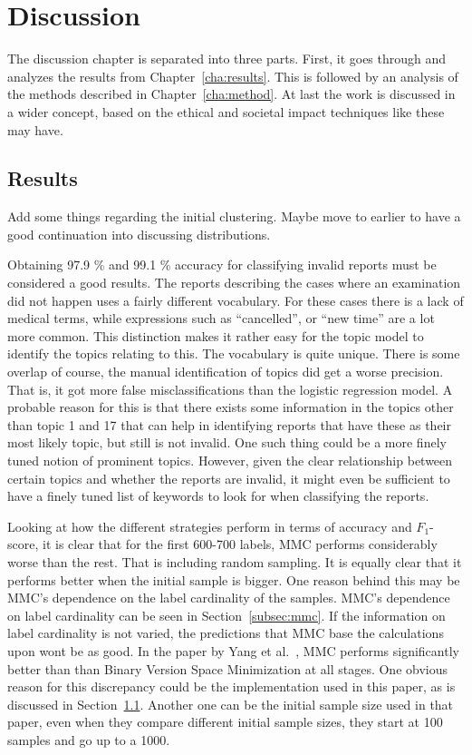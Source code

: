 \chapter{Discussion}
\label{cha:discussion}

The discussion chapter is separated into three parts.
First, it goes through and analyzes the results from Chapter~\ref{cha:results}.
This is followed by an analysis of the methods described in Chapter~\ref{cha:method}.
At last the work is discussed in a wider concept, based on the ethical and societal impact techniques like these may have.

\section{Results}
\label{sec:discussion-results}

Add some things regarding the initial clustering. Maybe move to earlier to have a good continuation into discussing distributions.

Obtaining 97.9 \% and 99.1 \% accuracy for classifying invalid reports must be considered a good results.
The reports describing the cases where an examination did not happen uses a fairly different vocabulary.
For these cases there is a lack of medical terms, while expressions such as ``cancelled'', or ``new time'' are a lot more common.
This distinction makes it rather easy for the topic model to identify the topics relating to this.
The vocabulary is quite unique.
There is some overlap of course, the manual identification of topics did get a worse precision.
That is, it got more false misclassifications than the logistic regression model.
A probable reason for this is that there exists some information in the topics other than topic 1 and 17 that can help in identifying reports that have these as their most likely topic, but still is not invalid.
One such thing could be a more finely tuned notion of prominent topics.
However, given the clear relationship between certain topics and whether the reports are invalid, it might even be sufficient to have a finely tuned list of keywords to look for when classifying the reports.

Looking at how the different strategies perform in terms of accuracy and $F_1$-score, it is clear that for the first 600-700 labels, MMC performs considerably worse than the rest.
That is including random sampling.
It is equally clear that it performs better when the initial sample is bigger.
One reason behind this may be MMC's dependence on the label cardinality of the samples.
MMC's dependence on label cardinality can be seen in Section~\ref{subsec:mmc}.
If the information on label cardinality is not varied, the predictions that MMC base the calculations upon wont be as good.
In the paper by Yang et al\@.~\cite{yang2009effective}, MMC performs significantly better than than Binary Version Space Minimization at all stages.
One obvious reason for this discrepancy could be the implementation used in this paper, as is discussed in Section~\ref{sec:discussion-results}.
Another one can be the initial sample size used in that paper, even when they compare different initial sample sizes, they start at 100 samples and go up to a 1000.

